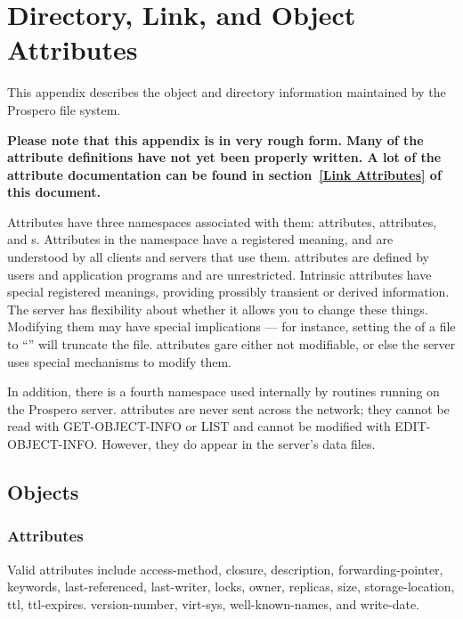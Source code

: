 \appendix

\chapter{Directory, Link, and Object Attributes\label{db}}

This appendix describes the object and directory information
maintained by the Prospero file system.

{\bf \large Please note that this appendix is in very rough
form.  Many of the attribute definitions have not yet been properly
written.  A lot of the attribute documentation can be found in
section~\ref{Link Attributes} of this document.}

Attributes have three namespaces
associated with them:  attributes, 
attributes, and s.
Attributes in the  namespace have a registered meaning, and
are understood by all clients and servers that use them.
 attributes are defined by users and application
programs and are unrestricted.  Intrinsic attributes have special
registered meanings, providing prossibly transient or derived
information.  The server has flexibility about whether it allows you
to change these things.  Modifying them may have special implications
--- for instance, setting the  of a file to 
``'' will truncate the file.   attributes
gare either not modifiable, or else the server uses special mechanisms
to modify them.

In addition, there is a fourth namespace used internally by routines
running on the Prospero server.    attributes are never
sent across the network; they cannot be read with GET-OBJECT-INFO or
LIST and cannot be modified with EDIT-OBJECT-INFO.  However, they do
appear in the server's data files.

\section{Objects}

\subsection{Attributes\label{access-method}}

Valid attributes include {\sc access-method,
closure, description, forwarding-pointer, keywords, last-referenced,
last-writer, locks, owner, replicas, size, storage-location, ttl,
ttl-expires.  version-number, virt-sys, well-known-names,} and {\sc
write-date}.


